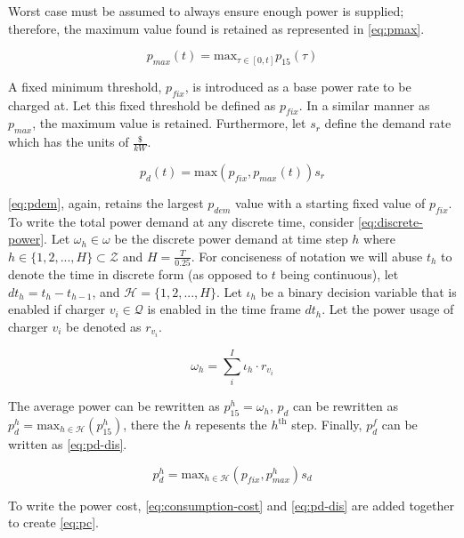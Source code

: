 \documentclass[ee,msthesis]{usuthesis}
\newcommand{\Qset}{\mathcal{Q}}             %
\newcommand{\Hset}{\mathcal{H}}             %
\begin{document}
Worst case must be assumed to always ensure enough power is supplied; therefore, the maximum value found is retained as
represented in \ref{eq:pmax}.

\begin{equation}
\label{eq:pmax}
p_{max}(t) = \text{max}_{\tau \in [0,t]}p_{15}(\tau)
\end{equation}

A fixed minimum threshold, \(p_{fix}\), is introduced as a base power rate to be charged at. Let this fixed threshold be
defined as \(p_{fix}\). In a similar manner as \(p_{max}\), the maximum value is retained. Furthermore, let \(s_r\) define the
demand rate which has the units of \(\frac{\$}{kW}\).

\begin{equation}
\label{eq:pdem}
p_d(t) = \text{max}(p_{fix},p_{max}(t))s_r
\end{equation}

\ref{eq:pdem}, again, retains the largest \(p_{dem}\) value with a starting fixed value of \(p_{fix}\). To write the total power
demand at any discrete time, consider \ref{eq:discrete-power}. Let \(\omega_h \in \omega\) be the discrete power demand at time step \(h\)
where \(h \in \{ 1, 2, ..., H \} \subset \mathcal{Z}\) and \(H = \frac{T}{0.25}\). For conciseness of notation we will abuse \(t_h\) to denote
the time in discrete form (as opposed to \(t\) being continuous), let \(dt_h = t_h - t_{h-1}\), and \(\Hset = \{ 1, 2, ..., H
\}\). Let \(\iota_h\) be a binary decision variable that is enabled if charger \(v_i \in \Qset\) is enabled in the time frame
\(dt_h\). Let the power usage of charger \(v_i\) be denoted as \(r_{v_i}\).

\begin{equation}
\label{eq:discrete-power}
  \omega_h = \sum_i^I \iota_h \cdot r_{v_i}
\end{equation}

The average power can be rewritten as \(p_{15}^h = \omega_h\), \(p_d\) can be rewritten as \(p_d^h = \text{max}_{h \in \Hset}
(p_{15}^{h})\), there the \(h\) repesents the \(h^{\text{th}}\) step. Finally, \(p_d^f\) can be written as \ref{eq:pd-dis}.

\begin{equation}
\label{eq:pd-dis}
  p_d^h = \text{max}_{h \in \Hset}(p_{fix}, p_{max}^h)s_d
\end{equation}

To write the power cost, \ref{eq:consumption-cost} and \ref{eq:pd-dis} are added together to create \ref{eq:pc}.
\end{document}
